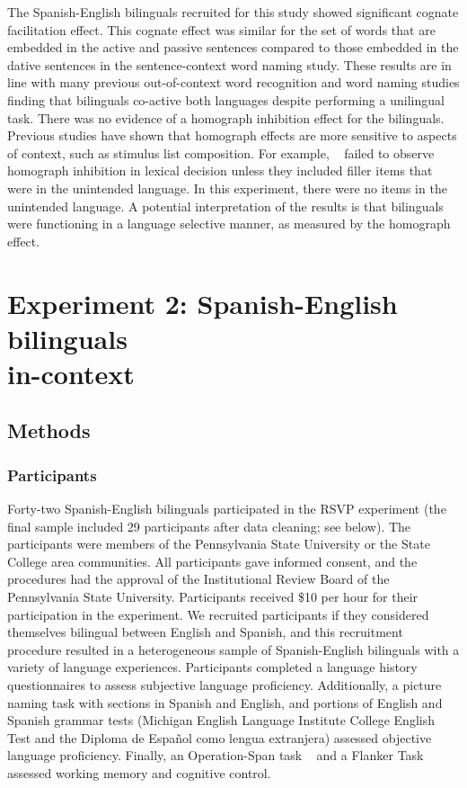 The Spanish-English bilinguals recruited for this study showed significant cognate facilitation effect. This cognate effect was similar for the set of words that are embedded in the active and passive sentences compared to those embedded in the dative sentences in the sentence-context word naming study. These results are in line with many previous out-of-context word recognition and word naming studies finding that bilinguals co-active both languages despite performing a unilingual task. There was no evidence of a homograph inhibition effect for the bilinguals. Previous studies have shown that homograph effects are more sensitive to aspects of context, such as stimulus list composition. For example, ~\citep{Dijkstra1998} failed to observe homograph inhibition in lexical decision unless they included filler items that were in the unintended language. In this experiment, there were no items in the unintended language. A potential interpretation of the results is that bilinguals were functioning in a language selective manner, as measured by the homograph effect. 

\section{Experiment 2: Spanish-English bilinguals\\ in-context}
\label{experiment2:spanish-englishbilingualsin-context}

\subsection{Methods}
\label{methods}

\subsubsection{Participants}
\label{participants}

Forty-two Spanish-English bilinguals participated in the RSVP experiment (the final sample included 29 participants after data cleaning; see below). The participants were members of the Pennsylvania State University or the State College area communities. All participants gave informed consent, and the procedures had the approval of the Institutional Review Board of the Pennsylvania State University. Participants received \$10 per hour for their participation in the experiment. We recruited participants if they considered themselves bilingual between English and Spanish, and this recruitment procedure resulted in a heterogeneous sample of Spanish-English bilinguals with a variety of language experiences. Participants completed a language history questionnaires to assess subjective language proficiency. Additionally, a picture naming task with sections in Spanish and English, and portions of English and Spanish grammar tests (Michigan English Language Institute College English Test and the Diploma de Espa\~{n}ol como lengua extranjera) assessed objective language proficiency. Finally, an Operation-Span task ~\citep[i.e., Automatic O-Span;][]{Unsworth2005} and a Flanker Task ~\citep[e.g.,][]{Bunge2002, Emmorey2008a} assessed working memory and cognitive control. 

